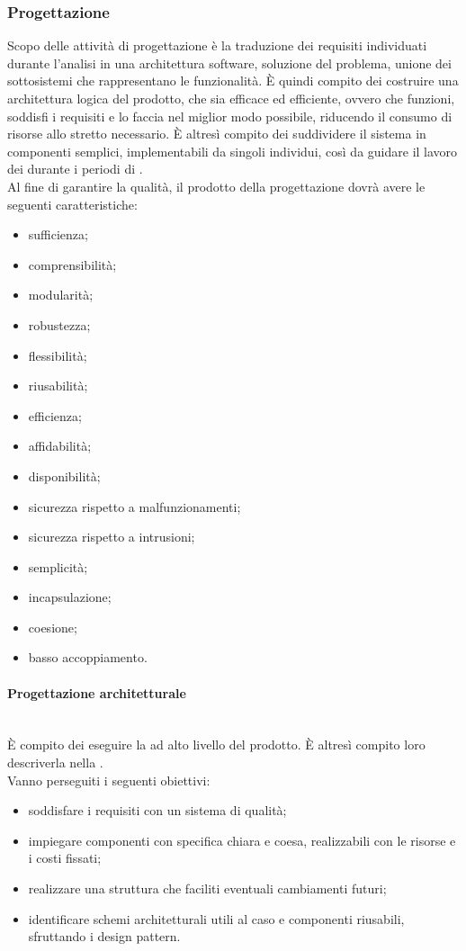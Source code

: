 \subsubsection{Progettazione}\label{Progettazione}
Scopo delle attività di progettazione è la traduzione dei requisiti individuati durante l'analisi in una architettura software, soluzione del problema, unione dei sottosistemi che rappresentano le funzionalità.
È quindi compito dei \Progettisti{} costruire una architettura logica del prodotto, che sia efficace ed efficiente, ovvero che funzioni, soddisfi i requisiti e lo faccia nel miglior modo possibile, riducendo il consumo di risorse allo stretto necessario. È altresì compito dei \Progettisti{} suddividere il sistema in componenti semplici, implementabili da singoli individui, così da guidare il lavoro dei \Programmatori{} durante i periodi di \Cod{}.\\
Al fine di garantire la qualità, il prodotto della progettazione dovrà avere le seguenti caratteristiche:
\begin{itemize}
	\item sufficienza;
	\item comprensibilità;
	\item modularità;
	\item robustezza;
	\item flessibilità;
	\item riusabilità;
	\item efficienza;
	\item affidabilità;
	\item disponibilità;
	\item sicurezza rispetto a malfunzionamenti;
	\item sicurezza rispetto a intrusioni;
	\item semplicità;
	\item incapsulazione;
	\item coesione;
	\item basso accoppiamento.
\end{itemize}

\paragraph{Progettazione architetturale}\mbox{}\\
\`{E} compito dei \Progettisti{} eseguire la \PA{} ad alto livello del prodotto. È altresì compito loro descriverla nella \SpecificaTecnica.\\
Vanno perseguiti i seguenti obiettivi:
\begin{itemize}
	\item soddisfare i requisiti con un sistema di qualità;
	\item impiegare componenti con specifica chiara e coesa, realizzabili con le risorse e i costi fissati;
	\item realizzare una struttura che faciliti eventuali cambiamenti futuri;
	\item identificare schemi architetturali utili al caso e componenti riusabili, sfruttando i design pattern.
\end{itemize}

